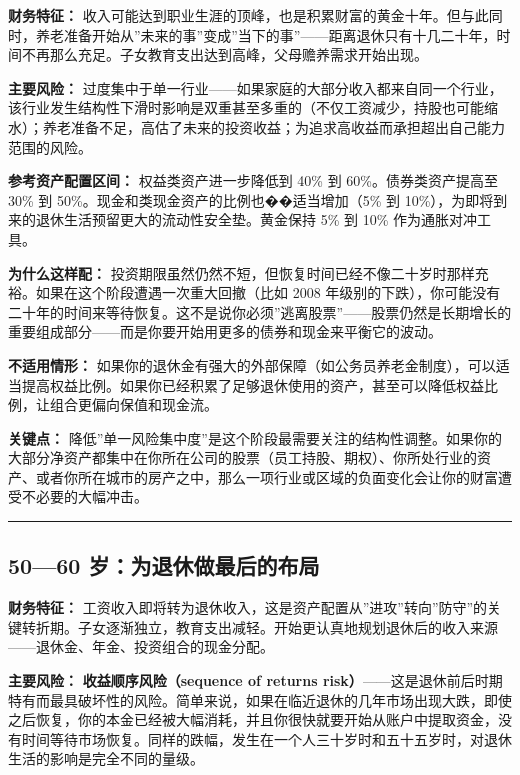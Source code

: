 \documentclass[a4paper,11pt,oneside,fontset=none,UTF8,zihao=-4]{ctexbook}
\begin{document}
\textbf{财务特征：}
收入可能达到职业生涯的顶峰，也是积累财富的黄金十年。但与此同时，养老准备开始从''未来的事''变成''当下的事''------距离退休只有十几二十年，时间不再那么充足。子女教育支出达到高峰，父母赡养需求开始出现。

\textbf{主要风险：}
过度集中于单一行业------如果家庭的大部分收入都来自同一个行业，该行业发生结构性下滑时影响是双重甚至多重的（不仅工资减少，持股也可能缩水）；养老准备不足，高估了未来的投资收益；为追求高收益而承担超出自己能力范围的风险。

\textbf{参考资产配置区间：} 权益类资产进一步降低到 40\% 到
60\%。债券类资产提高至 30\% 到
50\%。现金和类现金资产的比例也��适当增加（5\% 到
10\%），为即将到来的退休生活预留更大的流动性安全垫。黄金保持 5\% 到 10\%
作为通胀对冲工具。

\textbf{为什么这样配：}
投资期限虽然仍然不短，但恢复时间已经不像二十岁时那样充裕。如果在这个阶段遭遇一次重大回撤（比如
2008
年级别的下跌），你可能没有二十年的时间来等待恢复。这不是说你必须''逃离股票''------股票仍然是长期增长的重要组成部分------而是你要开始用更多的债券和现金来平衡它的波动。

\textbf{不适用情形：}
如果你的退休金有强大的外部保障（如公务员养老金制度），可以适当提高权益比例。如果你已经积累了足够退休使用的资产，甚至可以降低权益比例，让组合更偏向保值和现金流。

\textbf{关键点：}
降低''单一风险集中度''是这个阶段最需要关注的结构性调整。如果你的大部分净资产都集中在你所在公司的股票（员工持股、期权）、你所处行业的资产、或者你所在城市的房产之中，那么一项行业或区域的负面变化会让你的财富遭受不必要的大幅冲击。

\begin{center}{\color{dh-bronze}\rule{0.2\textwidth}{0.5pt}}\end{center}

\subsection{50---60
岁：为退休做最后的布局}\label{ux5c81ux4e3aux9000ux4f11ux505aux6700ux540eux7684ux5e03ux5c40}

\textbf{财务特征：}
工资收入即将转为退休收入，这是资产配置从''进攻''转向''防守''的关键转折期。子女逐渐独立，教育支出减轻。开始更认真地规划退休后的收入来源------退休金、年金、投资组合的现金分配。

\textbf{主要风险：} \textbf{收益顺序风险（sequence of returns
risk）}------这是退休前后时期特有而最具破坏性的风险。简单来说，如果在临近退休的几年市场出现大跌，即使之后恢复，你的本金已经被大幅消耗，并且你很快就要开始从账户中提取资金，没有时间等待市场恢复。同样的跌幅，发生在一个人三十岁时和五十五岁时，对退休生活的影响是完全不同的量级。
\end{document}
